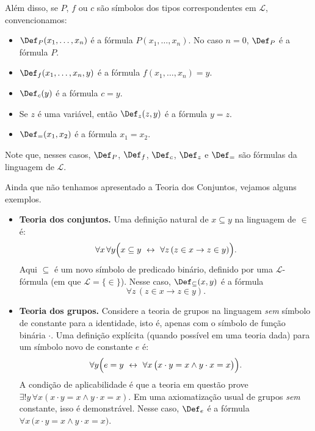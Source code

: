 \begin{metadefinition}[Definições]
Além disso, se $P$, $f$ ou $c$ são símbolos dos tipos correspondentes em $\mathcal L$, convencionamos:

\begin{itemize}
    \item $\Def_P(x_1,\ldots,x_n)$ é a fórmula $P(x_1,\ldots,x_n)$.
    No caso $n=0$, $\Def_P$ é a fórmula $P$.
    \item $\Def_f(x_1,\ldots,x_n,y)$ é a fórmula $f(x_1,\ldots,x_n)=y$.
    \item $\Def_c(y)$ é a fórmula $c=y$.
    \item Se $z$ é uma variável, então $\Def_{z}(z, y)$ é a fórmula $y=z$.
    \item $\Def_{=}(x_1, x_2)$ é a fórmula $x_1=x_2$.
\end{itemize}

Note que, nesses casos, $\Def_P$, $\Def_f$, $\Def_c$, $\Def_z$ e $\Def_=$ são fórmulas da linguagem de $\mathcal L$.
\end{metadefinition}

\begin{example}\label{exa:definicoesExplicitas}
Ainda que não tenhamos apresentado a Teoria dos Conjuntos, vejamos alguns exemplos.
\begin{itemize}
    \item \textbf{Teoria dos conjuntos.}
    Uma definição natural de $x\subseteq y$ na linguagem de $\in$ é:
    \[
        \forall x\,\forall y\Bigl(x\subseteq y\ \leftrightarrow\ \forall z\,(z\in x\rightarrow z\in y)\Bigr).
    \]
    Aqui $\subseteq$ é um novo símbolo de predicado binário, definido por uma $\mathcal L$-fórmula (em que $\mathcal L=\{\in\}$).
    Nesse caso, $\Def_{\subseteq}(x,y)$ é a fórmula
    \[
        \forall z\,(z\in x\rightarrow z\in y).
    \]

    \item \textbf{Teoria dos grupos.}
    Considere a teoria de grupos na linguagem \emph{sem} símbolo de constante para a identidade,
    isto é, apenas com o símbolo de função binária $\cdot$.
    Uma definição explícita (quando possível em uma teoria dada) para um símbolo novo de constante $e$ é:
    \[
        \forall y\Bigl(e=y\ \leftrightarrow\ \forall x\,\bigl(x\cdot y=x \wedge y\cdot x=x\bigr)\Bigr).
    \]
    A condição de aplicabilidade é que a teoria em questão prove $\exists!y\,\forall x(x\cdot y=x\wedge y\cdot x=x)$.
    Em uma axiomatização usual de grupos \emph{sem} constante, isso é demonstrável.
    Nesse caso, $\Def_e$ é a fórmula $\forall x\,\bigl(x\cdot y=x \wedge y\cdot x=x\bigr)$.
\end{itemize}
\end{example}

